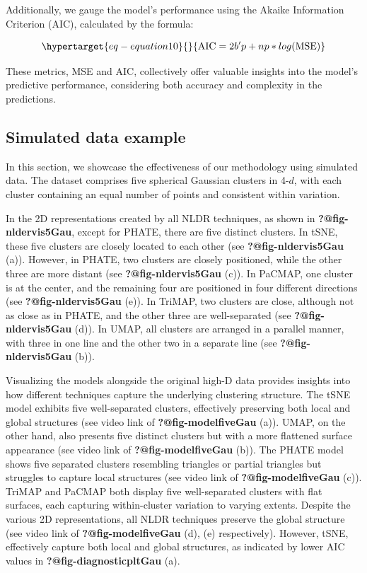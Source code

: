 \documentclass[
  12pt]{article}
\begin{document}
Additionally, we gauge the model's performance using the Akaike
Information Criterion (AIC), calculated by the formula:

\begin{equation}\protect\hypertarget{eq-equation10}{}{
\text{AIC} = 2b'p + np * log(\text{MSE})
}\label{eq-equation10}\end{equation}

These metrics, MSE and AIC, collectively offer valuable insights into
the model's predictive performance, considering both accuracy and
complexity in the predictions.

\hypertarget{sec-simpleex}{%
\subsection{Simulated data example}\label{sec-simpleex}}

In this section, we showcase the effectiveness of our methodology using
simulated data. The dataset comprises five spherical Gaussian clusters
in 4-\(d\), with each cluster containing an equal number of points and
consistent within variation.

In the 2D representations created by all NLDR techniques, as shown in
\textbf{?@fig-nldervis5Gau}, except for PHATE, there are five distinct
clusters. In tSNE, these five clusters are closely located to each other
(see \textbf{?@fig-nldervis5Gau} (a)). However, in PHATE, two clusters
are closely positioned, while the other three are more distant (see
\textbf{?@fig-nldervis5Gau} (c)). In PaCMAP, one cluster is at the
center, and the remaining four are positioned in four different
directions (see \textbf{?@fig-nldervis5Gau} (e)). In TriMAP, two
clusters are close, although not as close as in PHATE, and the other
three are well-separated (see \textbf{?@fig-nldervis5Gau} (d)). In UMAP,
all clusters are arranged in a parallel manner, with three in one line
and the other two in a separate line (see \textbf{?@fig-nldervis5Gau}
(b)).

Visualizing the models alongside the original high-D data provides
insights into how different techniques capture the underlying clustering
structure. The tSNE model exhibits five well-separated clusters,
effectively preserving both local and global structures (see video link
of \textbf{?@fig-modelfiveGau} (a)). UMAP, on the other hand, also
presents five distinct clusters but with a more flattened surface
appearance (see video link of \textbf{?@fig-modelfiveGau} (b)). The
PHATE model shows five separated clusters resembling triangles or
partial triangles but struggles to capture local structures (see video
link of \textbf{?@fig-modelfiveGau} (c)). TriMAP and PaCMAP both display
five well-separated clusters with flat surfaces, each capturing
within-cluster variation to varying extents. Despite the various 2D
representations, all NLDR techniques preserve the global structure (see
video link of \textbf{?@fig-modelfiveGau} (d), (e) respectively).
However, tSNE, effectively capture both local and global structures, as
indicated by lower AIC values in \textbf{?@fig-diagnosticpltGau} (a).
\end{document}
